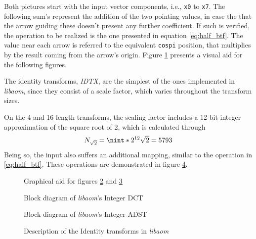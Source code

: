 Both pictures start with the input vector components, i.e., \texttt{x0} to \texttt{x7}. The following sum's represent the addition of the two pointing values, in case the that the arrow guiding these doesn't present any further coefficient. If such is verified, the operation to be realized is the one presented in equation \ref{eq:half_btf}. The value near each arrow is referred to the equivalent \texttt{cospi} position, that multiplies by the result coming from the arrow's origin. Figure \ref{fig:aid} presents a visual aid for the following figures.

The identity transforms, \emph{IDTX}, are the simplest of the ones implemented in \emph{libaom}, since they consist of a scale factor, which varies throughout the transform sizes.

On the 4 and 16 length transforms, the scaling factor includes a 12-bit integer approximation of the square root of 2, which is calculated through
\begin{equation}
    N_{\sqrt{2}}=\nint*{2^{12}\sqrt{2}}=5793
\end{equation}
Being so, the input also suffers an additional mapping, similar to the operation in \ref{eq:half_btf}. These operations are demonstrated in figure \ref{fig:intIDEN}.

\begin{figure}[!htbp]
    \centering
    
    \caption{Graphical aid for figures \ref{fig:intDCT} and \ref{fig:intADST}}
    \label{fig:aid}
\end{figure}

\begin{figure}[!htbp]
    \centering
    
    \caption{Block diagram of \emph{libaom}'s Integer DCT}
    \label{fig:intDCT}
\end{figure}


\clearpage
\begin{landscape}
    \vspace*{\fill}
    \begin{figure}[h]
        \centering
        
        \caption{Block diagram of \emph{libaom}'s Integer ADST}
        \label{fig:intADST}
    \end{figure}
    \vspace*{\fill}        
\end{landscape}
\clearpage


\begin{figure}[!htbp]
    \centering
    
    \caption{Description of the Identity transforms in \emph{libaom}}
    \label{fig:intIDEN}
\end{figure}

